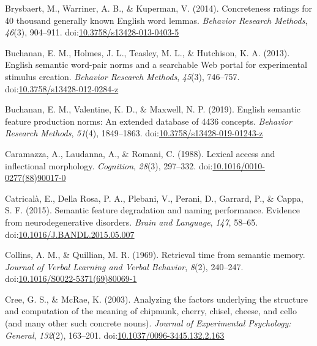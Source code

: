 \documentclass[man]{apa6}
\begin{document}
\leavevmode\hypertarget{ref-Brysbaert2014}{}%
Brysbaert, M., Warriner, A. B., \& Kuperman, V. (2014). Concreteness ratings for 40 thousand generally known English word lemmas. \emph{Behavior Research Methods}, \emph{46}(3), 904--911. doi:\href{https://doi.org/10.3758/s13428-013-0403-5}{10.3758/s13428-013-0403-5}

\leavevmode\hypertarget{ref-Buchanan2013}{}%
Buchanan, E. M., Holmes, J. L., Teasley, M. L., \& Hutchison, K. A. (2013). English semantic word-pair norms and a searchable Web portal for experimental stimulus creation. \emph{Behavior Research Methods}, \emph{45}(3), 746--757. doi:\href{https://doi.org/10.3758/s13428-012-0284-z}{10.3758/s13428-012-0284-z}

\leavevmode\hypertarget{ref-Buchanan2019}{}%
Buchanan, E. M., Valentine, K. D., \& Maxwell, N. P. (2019). English semantic feature production norms: An extended database of 4436 concepts. \emph{Behavior Research Methods}, \emph{51}(4), 1849--1863. doi:\href{https://doi.org/10.3758/s13428-019-01243-z}{10.3758/s13428-019-01243-z}

\leavevmode\hypertarget{ref-Caramazza1988}{}%
Caramazza, A., Laudanna, A., \& Romani, C. (1988). Lexical access and inflectional morphology. \emph{Cognition}, \emph{28}(3), 297--332. doi:\href{https://doi.org/10.1016/0010-0277(88)90017-0}{10.1016/0010-0277(88)90017-0}

\leavevmode\hypertarget{ref-Catricala2015}{}%
Catricalà, E., Della Rosa, P. A., Plebani, V., Perani, D., Garrard, P., \& Cappa, S. F. (2015). Semantic feature degradation and naming performance. Evidence from neurodegenerative disorders. \emph{Brain and Language}, \emph{147}, 58--65. doi:\href{https://doi.org/10.1016/J.BANDL.2015.05.007}{10.1016/J.BANDL.2015.05.007}

\leavevmode\hypertarget{ref-Collins1969}{}%
Collins, A. M., \& Quillian, M. R. (1969). Retrieval time from semantic memory. \emph{Journal of Verbal Learning and Verbal Behavior}, \emph{8}(2), 240--247. doi:\href{https://doi.org/10.1016/S0022-5371(69)80069-1}{10.1016/S0022-5371(69)80069-1}

\leavevmode\hypertarget{ref-Cree2003}{}%
Cree, G. S., \& McRae, K. (2003). Analyzing the factors underlying the structure and computation of the meaning of chipmunk, cherry, chisel, cheese, and cello (and many other such concrete nouns). \emph{Journal of Experimental Psychology: General}, \emph{132}(2), 163--201. doi:\href{https://doi.org/10.1037/0096-3445.132.2.163}{10.1037/0096-3445.132.2.163}
\end{document}
